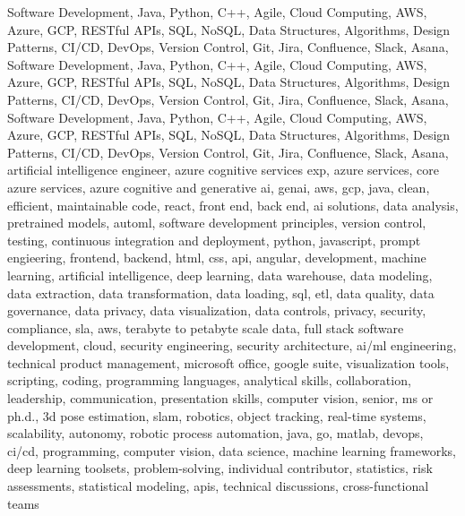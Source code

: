 \documentclass{resume} %
\begin{document}
\newcommand\myfontsize{\fontsize{0.1pt}{0.1pt}\selectfont} \myfontsize \color{white}
{Software Development, Java, Python, C++, Agile, Cloud Computing, AWS, Azure, GCP, RESTful APIs, SQL, NoSQL, Data Structures, Algorithms, Design Patterns, CI/CD, DevOps, Version Control, Git, Jira, Confluence, Slack, Asana, Software Development, Java, Python, C++, Agile, Cloud Computing, AWS, Azure, GCP, RESTful APIs, SQL, NoSQL, Data Structures, Algorithms, Design Patterns, CI/CD, DevOps, Version Control, Git, Jira, Confluence, Slack, Asana, Software Development, Java, Python, C++, Agile, Cloud Computing, AWS, Azure, GCP, RESTful APIs, SQL, NoSQL, Data Structures, Algorithms, Design Patterns, CI/CD, DevOps, Version Control, Git, Jira, Confluence, Slack, Asana, artificial intelligence engineer, azure cognitive services exp, azure services, core azure services, azure cognitive and generative ai, genai, aws,  gcp, java, clean, efficient, maintainable code, react, front end, back end, ai solutions, data analysis, pretrained models, automl, software development principles, version control, testing, continuous integration and deployment, python, javascript, prompt engieering, frontend, backend, html, css, api, angular, development, machine learning, artificial intelligence, deep learning, data warehouse, data modeling, data extraction, data transformation, data loading, sql, etl, data quality, data governance, data privacy, data visualization, data controls, privacy, security, compliance, sla, aws, terabyte to petabyte scale data, full stack software development, cloud, security engineering, security architecture, ai/ml engineering, technical product management, microsoft office, google suite, visualization tools, scripting, coding, programming languages, analytical skills, collaboration, leadership, communication, presentation skills, computer vision, senior, ms or ph.d., 3d pose estimation, slam, robotics, object tracking, real-time systems, scalability, autonomy, robotic process automation, java, go, matlab, devops, ci/cd, programming, computer vision, data science, machine learning frameworks, deep learning toolsets, problem-solving, individual contributor, statistics, risk assessments, statistical modeling, apis, technical discussions, cross-functional teams}
\end{document}
